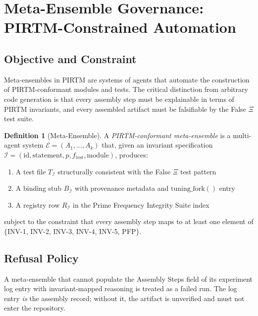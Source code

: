 \documentclass[12pt,letterpaper]{article}
\theoremstyle{definition}
\newtheorem{definition}{Definition}[section]
\theoremstyle{remark}
\begin{document}
\section{Meta-Ensemble Governance: PIRTM-Constrained Automation}

\subsection{Objective and Constraint}

Meta-ensembles in PIRTM are systems of agents that automate the construction of PIRTM-conformant modules and tests. The critical distinction from arbitrary code generation is that every assembly step must be explainable in terms of PIRTM invariants, and every assembled artifact must be falsifiable by the False $\Xi$ test suite.

\begin{definition}[Meta-Ensemble]
A \emph{PIRTM-conformant meta-ensemble} is a multi-agent system $\mathcal{E} = (A_1, \ldots, A_k)$ that, given an invariant specification $\mathcal{I} = (\mathrm{id}, \mathrm{statement}, p, f_{\mathrm{test}}, \mathrm{module})$, produces:
\begin{enumerate}[noitemsep]
\item A test file $T_\mathcal{I}$ structurally consistent with the False $\Xi$ test pattern
\item A binding stub $B_\mathcal{I}$ with provenance metadata and $\mathrm{tuning\_fork}()$ entry
\item A registry row $R_\mathcal{I}$ in the Prime Frequency Integrity Suite index
\end{enumerate}
subject to the constraint that every assembly step maps to at least one element of $\{$INV-1, INV-2, INV-3, INV-4, INV-5, PFP$\}$.
\end{definition}

\subsection{Refusal Policy}

A meta-ensemble that cannot populate the Assembly Steps field of its experiment log entry with invariant-mapped reasoning is treated as a failed run. The log entry \emph{is} the assembly record; without it, the artifact is unverified and must not enter the repository.
\end{document}
